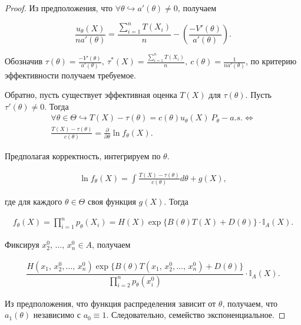 \begin{proof}
    
    Из предположения, что $\displaystyle \forall \theta \hookrightarrow a'( \theta ) \neq 0$, получаем
    
    
    \begin{equation*}
    \frac{u_{\theta }( X)}{na'( \theta )} =\frac{\sum _{i=1}^{n} T( X_{i})}{n} -\left(\frac{-V'( \theta )}{a'( \theta )}\right) .
    \end{equation*}
    
    
    Обозначив $\displaystyle \tau ( \theta ) =\frac{-V'( \theta )}{a'( \theta )} ,\ \tau ^{*}( X) =\frac{\sum _{i=1}^{n} T( X_{i})}{n} ,\ c( \theta ) =\frac{1}{na'( \theta )}$, по критерию эффективности получаем требуемое.
    
    Обратно, пусть существует эффективная оценка $\displaystyle T( X)$ для $\displaystyle \tau ( \theta )$. Пусть $\displaystyle \tau '( \theta ) \neq 0$. Тогда
    \begin{gather*}
         \forall \theta \in \Theta \hookrightarrow T(X) - \tau(\theta) = c(\theta)u_\theta(X)\ P_\theta-a.s. \Leftrightarrow\\
         \frac{T(X) - \tau(\theta)}{c(\theta)} = \frac{\partial}{\partial\theta}\ln f_\theta(X).
    \end{gather*}
    
    Предполагая корректность, интегрируем по $\theta$.
    
    \begin{gather*}
        \ln f_\theta(X) = \int\frac{T(X)-\tau(\theta)}{c(\theta)}d\theta + g(X),
    \end{gather*}
    
    где для каждого $\theta \in \Theta$ своя функция $g(X)$. Тогда
    
    \begin{gather*}
        f_\theta(X) = \prod_{i=1}^n p_\theta(X_i) = H(X)\exp\{B(\theta)T(X) + D(\theta)\}\cdot\mathbb{I}_A(X).
    \end{gather*}
    
    Фиксируя $x_2^0,\, \ldots,\, x_n^0 \in A$, получаем
    
    \begin{gather*}
        \dfrac{H(x_1,\, x_2^0, \ldots,\, x_n^0)\exp\{B(\theta)T(x_1,\, x_2^0, \ldots,\, x_n^0) + D(\theta)\}}{\prod_{i=2}^n p_\theta(x_i^0)}\cdot\mathbb{I}_A(X).
    \end{gather*}
    
    Из предположения, что функция распределения зависит от $\theta$, получаем, что $a_1(\theta)$ независимо с $a_0 \equiv 1$. Следовательно, семейство экспоненциальное.
    \end{proof}
    
